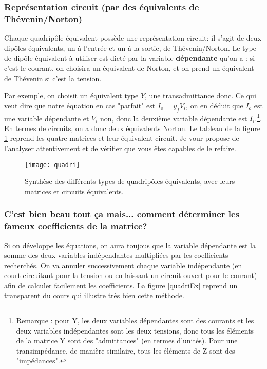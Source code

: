 \subsubsection*{Représentation circuit (par des équivalents de Thévenin/Norton)}
Chaque quadripôle équivalent possède une représentation \og circuit\fg : il s'agit de deux dipôles équivalents, un à l'entrée et un à la sortie, de Thévenin/Norton. Le type de dipôle équivalent à utiliser est dicté par la variable \textbf{dépendante} qu'on a : si c'est le courant, on choisira un équivalent de Norton, et on prend un équivalent de Thévenin si c'est la tension.

Par exemple, on choisit un équivalent type $Y$, une transadmittance donc. Ce qui veut dire que notre équation en cas "parfait" est $I_o = y_f V_i$, on en déduit que $I_o$ est une variable dépendante et $V_i$ non, donc la deuxième variable dépendante est $I_i$.\footnote{Remarque : pour Y, les deux variables dépendantes sont des courants et les deux variables indépendantes sont les deux tensions, donc tous les éléments de la matrice Y sont des "admittances" (en termes d'unités). Pour une transimpédance, de manière similaire, tous les éléments de Z sont des "impédances".}. En termes de circuits, on a donc deux équivalents Norton. Le tableau de la figure \ref{quadriTab} reprend les quatre matrices et leur équivalent circuit. Je vour propose de l'analyser attentivement et de vérifier que vous êtes capables de le refaire.
\begin{figure}[h]
	\centering
    \texttt{[image: quadri]}
    \caption{Synthèse des différents types de quadripôles équivalents, avec leurs matrices et circuits équivalents.}
    \label{quadriTab}
\end{figure}
\subsubsection*{C'est bien beau tout ça mais... comment déterminer les fameux coefficients de la matrice?}
Si on développe les équations, on aura toujous que la variable dépendante est la somme des deux variables indépendantes multipliées par les coefficients recherchés. On va annuler successivement chaque variable indépendante (en court-circuitant pour la tension ou en laissant un circuit ouvert pour le courant) afin de calculer facilement les coefficients. La figure \ref{quadriEx} reprend un transparent du cours qui illustre très bien cette méthode.

